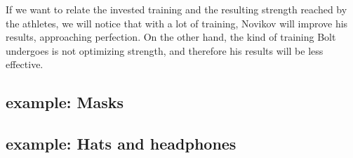 \begin{figure}[h!]
  \begin{center}
\end{center}
  \caption{\label{fig:strong_training}}
\end{figure}


If we want to relate the invested training and the resulting strength reached by the athletes, we will notice that with a lot of training, Novikov will improve his results, approaching perfection.
On the other hand, the kind of training Bolt undergoes is not optimizing strength, and therefore his results will be less effective.


\devel{} %

\subsection{example: Masks}

\devel{ }%


\subsection{example: Hats and headphones}

\devel{} %
